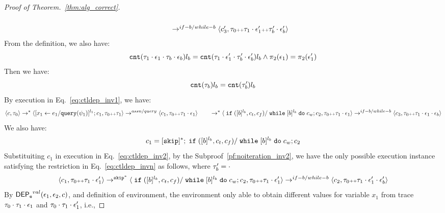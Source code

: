 \begin{proof}[Proof of Theorem.~\ref{thm:alg_correct}]
\begin{equation}
\begin{array}{l}
   \\ \qquad
  \rightarrow^{if-b / while-b} 
  \langle {c}_3',  \mathtt{\tau}_0 {\scriptscriptstyle ++} \mathtt{\tau}_1 \cdot \mathtt{\epsilon}_1' {\scriptscriptstyle ++} \mathtt{\tau}_b' \cdot \mathtt{\epsilon}_b' \rangle 
\end{array}
\end{equation}
%
From the definition, we also have:
\[
  \mathtt{cnt}(\mathtt{\tau}_1 \cdot \mathtt{\epsilon}_1 \cdot \mathtt{\tau}_b\cdot \mathtt{\epsilon}_b) l_b
= 
\mathtt{cnt}(\mathtt{\tau}_1 \cdot \mathtt{\epsilon}_1' \cdot \mathtt{\tau}_b'\cdot \mathtt{\epsilon}_b') l_b
\land 
\pi_2(\mathtt{\epsilon}_1) = \pi_2(\mathtt{\epsilon}_1')
\]
%
Then we have:
 \begin{equation}
\label{eq:ctldep_invn}
  \mathtt{cnt}(\mathtt{\tau}_b) l_b = \mathtt{cnt}(\mathtt{\tau}_b') l_b
\end{equation}
 By execution in Eq.~\ref{eq:ctldep_inv1}, we have:
\[
\langle {c}, \mathtt{\tau}_0 \rangle \rightarrow^{*} 
\langle [\mathrel{ {x}_1 \leftarrow e_1 / {\tt query}(\psi_1) }]^{l_1} ; {c}_1, \mathtt{\tau}_0 {\scriptscriptstyle ++} \mathtt{\tau}_1 \rangle  
\rightarrow^{assn/query}
 \langle c_1, \mathtt{\tau}_0 {\scriptscriptstyle ++} \mathtt{\tau}_1 \cdot \mathtt{\epsilon}_1 \rangle 
 \\ \qquad 
 \rightarrow^{*} 
  \langle \;\mathtt{if}\;([b]{}^{l_b}, c_t, c_f) / \;\mathtt{while}\; [b]{}^{l_b} \;\mathtt{do}\; c_w; {c}_2, 
  \mathtt{\tau}_0 {\scriptscriptstyle ++} \mathtt{\tau}_1 \cdot \mathtt{\epsilon}_1 \rangle 
  \rightarrow^{if-b / while-b} 
  \langle {c}_3,  \mathtt{\tau}_0 {\scriptscriptstyle ++} \mathtt{\tau}_1 \cdot \mathtt{\epsilon}_1 \cdot \mathtt{\epsilon}_b \rangle 
 \]
 We also have:
 \[
 c_1 = [\mathtt{skip}]^*;\;\mathtt{if}\;([b]{}^{l_b}, c_t, c_f) / \;\mathtt{while}\; [b]{}^{l_b} \;\mathtt{do}\; c_w; {c}_2
 \]
Substituiting $c_1$ in execution in Eq.~\ref{eq:ctldep_inv2}, by the Subproof~\ref{pf:noiteration_inv2}, 
we have the only possible execution instance satisfying 
the restriction in Eq.~\ref{eq:ctldep_invn} as follows, where $\mathtt{\tau}_b' = \cdot$
%
 \[
  \langle c_1, \mathtt{\tau}_0 {\scriptscriptstyle ++} \mathtt{\tau}_1 \cdot \mathtt{\epsilon}_1' \rangle 
  \rightarrow^{\mathtt{skip}^*} 
  \langle 
  \;\mathtt{if}\;([b]{}^{l_b}, c_t, c_f) / \;\mathtt{while}\; [b]{}^{l_b} \;\mathtt{do}\; c_w; {c}_2, 
  \mathtt{\tau}_0 {\scriptscriptstyle ++} \mathtt{\tau}_1 \cdot \mathtt{\epsilon}_1' \rangle 
  \rightarrow^{if-b / while-b} 
  \langle {c}_2,  \mathtt{\tau}_0 {\scriptscriptstyle ++} \mathtt{\tau}_1 \cdot \mathtt{\epsilon}_1' \cdot \mathtt{\epsilon}_b' \rangle 
 \]
By $\mathsf{DEP_{\mathtt{e}}}^{val}(\mathtt{\epsilon}_1, \mathtt{\epsilon}_2, c)$, and definition of environment, 
the environment only able to obtain different values for variable $x_1$ 
from trace $\mathtt{\tau}_0 \cdot \mathtt{\tau}_1 \cdot \mathtt{\epsilon}_1$ and 
$\mathtt{\tau}_0 \cdot \mathtt{\tau}_1 \cdot \mathtt{\epsilon}_1'$, i.e.,

\end{proof}
